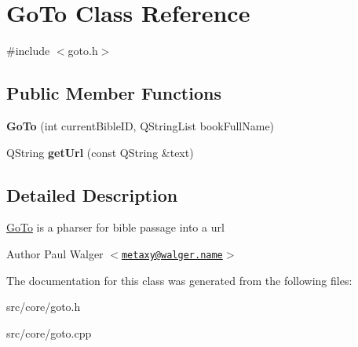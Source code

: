 \hypertarget{classGoTo}{
\section{GoTo Class Reference}
\label{classGoTo}
}


{\ttfamily \#include $<$goto.h$>$}\subsection*{Public Member Functions}
\begin{DoxyCompactItemize}
\item 
\hypertarget{classGoTo_af65860fd8cbfde047a2ac0b848c08ccb}{
{\bfseries GoTo} (int currentBibleID, QStringList bookFullName)}
\label{classGoTo_af65860fd8cbfde047a2ac0b848c08ccb}

\item 
\hypertarget{classGoTo_abeb80d20c63ea781fb6426690b11a8c1}{
QString {\bfseries getUrl} (const QString \&text)}
\label{classGoTo_abeb80d20c63ea781fb6426690b11a8c1}

\end{DoxyCompactItemize}


\subsection{Detailed Description}
\hyperlink{classGoTo}{GoTo} is a pharser for bible passage into a url

\begin{DoxyAuthor}{Author}
Paul Walger $<$\href{mailto:metaxy@walger.name}{\tt metaxy@walger.name}$>$ 
\end{DoxyAuthor}


The documentation for this class was generated from the following files:\begin{DoxyCompactItemize}
\item 
src/core/goto.h\item 
src/core/goto.cpp\end{DoxyCompactItemize}
